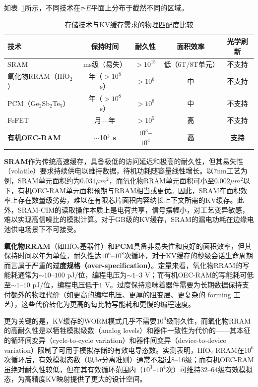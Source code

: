 如表~\ref{tab:kv_tech_match}所示，不同技术在$\tau$-$E$平面上分布于截然不同的区域。

\begin{table}[htbp]
\centering
\caption{存储技术与KV缓存需求的物理匹配度比较}
\label{tab:kv_tech_match}
\begin{tabular}{lcccc}
\toprule
技术 & 保持时间 & 耐久性 & 面积效率 & 光学刷新 \\
\midrule
SRAM & ms级（易失） & $>10^{15}$ & 低（6T/8T单元） & 不支持 \\
氧化物RRAM（HfO$_2$） & 年（$>10^8$ s） & $>10^{6}$ & 中 & 不支持 \\
PCM（Ge$_2$Sb$_2$Te$_5$） & 年（$>10^8$ s） & $>10^{8}$ & 中 & 不支持 \\
FeFET & 月—年 & $>10^{5}$ & 高 & 不支持 \\
\textbf{有机OEC-RAM} & \textbf{$\sim$10$^3$ s} & \textbf{$10^3$–$10^4$} & \textbf{高} & \textbf{支持} \\
\bottomrule
\end{tabular}
\end{table}

\textbf{SRAM}作为传统高速缓存，具备极低的访问延迟和极高的耐久性，但其易失性（volatile）要求持续供电以维持数据，待机功耗随容量线性增长。以7nm工艺为例，SRAM单元面积约为$0.031 \mu m^2$，而氧化物RRAM单元面积可小至$0.002 \mu m^2$以下，有机OEC-RAM单元面积预期与RRAM相当或更优。因此，SRAM在面积效率上存在数量级劣势，难以在有限芯片面积内容纳长上下文所需的KV缓存。此外，SRAM-CIM的读取操作本质上是电荷共享，信号摆幅小，对工艺变异敏感，难以实现高信噪比的模拟计算。对于GB级的KV缓存，SRAM的漏电功耗在边缘电池供电场景下不可接受。

\textbf{氧化物RRAM}（如HfO$_2$基器件）和\textbf{PCM}具备非易失性和良好的面积效率，但其保持时间以年为单位，耐久性达$10^6$–$10^8$次循环，对于KV缓存的秒级会话生命周期而言属于严重的\textbf{过度规格（over-specification）}。定量来看，氧化物RRAM的写能耗通常为$\sim$$10$–$100$ pJ/位，编程电压为$\sim$$1$–$3$ V；而有机OEC-RAM的写能耗可低至$\sim$$1$–$10$ pJ/位，编程电压低于$1$ V。过度保持意味着器件需要为长期数据保持支付额外的物理代价（如更高的编程电压、更厚的阻变层、更复杂的 forming 工艺），这些代价转化为更高的每比特写能耗和更慢的编程速度。

更为关键的是，KV缓存的WORM模式几乎不需要$10^6$级耐久性，而氧化物RRAM的高耐久性是以牺牲模拟级数（analog levels）和器件一致性为代价的——其本征的循环间变异（cycle-to-cycle variation）和器件间变异（device-to-device variation）限制了可用于模拟存储的有效电导态数。实测表明，HfO$_2$ RRAM在$10^6$次循环后，有效模拟态数（以$3\sigma$分离准则）通常不超过8–16级；而有机OEC-RAM虽绝对耐久性较低，但在其有效循环范围内（$10^3$–$10^4$次）可维持32–64级有效模拟态，为高精度KV映射提供了更大的设计空间。

